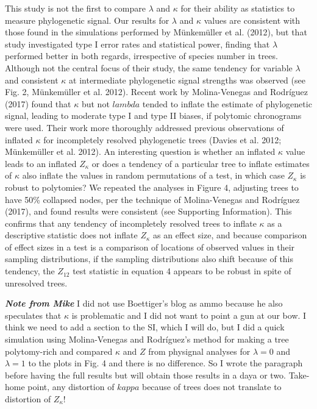 \documentclass[]{article}
\begin{document}
This study is not the first to compare \(\lambda\) and \(\kappa\) for
their ability as statistics to measure phylogenetic signal. Our results
for \(\lambda\) and \(\kappa\) values are consistent with those found in
the simulations performed by Münkemüller et al. (2012), but that study
investigated type I error rates and statistical power, finding that
\(\lambda\) performed better in both regards, irrespective of species
number in trees. Although not the central focus of their study, the same
tendency for variable \(\lambda\) and consistent \(\kappa\) at
intermediate phylogenetic signal strengths was observed (see Fig. 2,
Münkemüller et al. 2012). Recent work by Molina-Venegas and Rodríguez
(2017) found that \(\kappa\) but not \(lambda\) tended to inflate the
estimate of phylogenetic signal, leading to moderate type I and type II
biases, if polytomic chronograms were used. Their work more thoroughly
addressed previous observations of inflated \(\kappa\) for incompletely
resolved phylogenetic trees (Davies et al. 2012; Münkemüller et al.
2012). An interesting question is whether an inflated \(\kappa\) value
leads to an inflated \(Z_\kappa\) or does a tendency of a particular
tree to inflate estimates of \(\kappa\) also inflate the values in
random permutations of a test, in which case \(Z_\kappa\) is robust to
polytomies? We repeated the analyses in Figure 4, adjusting trees to
have 50\% collapsed nodes, per the technique of Molina-Venegas and
Rodríguez (2017), and found results were consistent (see Supporting
Information). This confirms that any tendency of incompletely resolved
trees to inflate \(\kappa\) as a descriptive statistic does not inflate
\(Z_\kappa\) as an effect size, and because comparison of effect sizes
in a test is a comparison of locations of observed values in their
sampling distributions, if the sampling distributions also shift because
of this tendency, the \(Z_{12}\) test statistic in equation 4 appears to
be robust in spite of unresolved trees. \hfill\break  

\textbf{\emph{Note from Mike}} I did not use Boettiger's blog as ammo
because he also speculates that \(\kappa\) is problematic and I did not
want to point a gun at our bow. I think we need to add a section to the
SI, which I will do, but I did a quick simulation using Molina-Venegas
and Rodríguez's method for making a tree polytomy-rich and compared
\(\kappa\) and \(Z\) from physignal analyses for \(\lambda = 0\) and
\(\lambda = 1\) to the plots in Fig. 4 and there is no difference. So I
wrote the paragraph before having the full results but will obtain those
results in a daya or two. Take-home point, any distortion of \(kappa\)
because of trees does not translate to distortion of \(Z_{\kappa}\)!
\hfill\break
\end{document}
